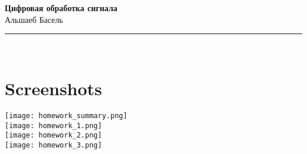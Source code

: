 \documentclass{article}
\newcommand{\coursetitle}[1]{
  \begin{center}
    \vspace*{1cm}
    {\Huge \textbf{#1}} \\
    \vspace{0.5cm}
    {\large Альшаеб Басель} \\
    \vspace{1cm}
    \rule{\textwidth}{1pt} \\
    \vspace{1cm}
  \end{center}
}
\begin{document}
\coursetitle{Цифровая обработка сигнала}

\section*{Screenshots}
\begin{center}
  \texttt{[image: homework\_summary.png]} \\
  \vspace{0.5cm}
  \texttt{[image: homework\_1.png]} \\
  \vspace{0.5cm}
  \texttt{[image: homework\_2.png]} \\
  \vspace{0.5cm}
  \texttt{[image: homework\_3.png]} \\
  \vspace{0.5cm}

\end{center}
\end{document}
